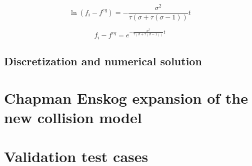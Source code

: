 \documentclass{article}
\begin{document}
\begin{equation*}
    \ln{(f_i-f^{eq})}= -\frac{\sigma^2}{\tau(\sigma + \tau(\sigma-1))} t 
\end{equation*}

\begin{equation*}
    f_i-f^{eq}= e^{{-\frac{\sigma^2}{\tau(\sigma + \tau(\sigma-1))} t}} 
\end{equation*}

\subsection{Discretization and numerical solution}

\section{Chapman Enskog expansion of the new collision model}

\section{Validation test cases}
\end{document}

